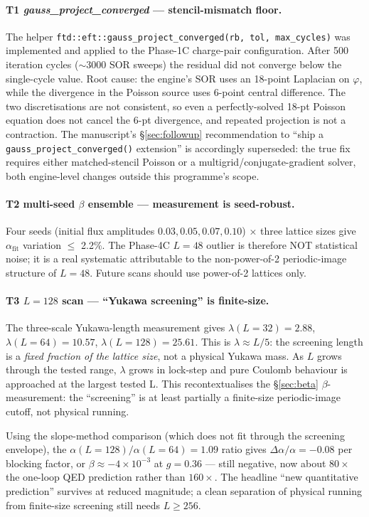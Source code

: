 \documentclass[11pt,letterpaper]{article}
\begin{document}
\paragraph{T1 \textit{gauss\_project\_converged} — stencil-mismatch floor.}
The helper
\texttt{ftd::eft::gauss\_project\_converged(rb,\,tol,\,max\_cycles)}
was implemented and applied to the Phase-1C charge-pair configuration.
After 500 iteration cycles ($\sim 3000$ SOR sweeps) the residual did
not converge below the single-cycle value. Root cause: the engine's
SOR uses an 18-point Laplacian on $\varphi$, while the divergence in
the Poisson source uses 6-point central difference. The two
discretisations are not consistent, so even a perfectly-solved 18-pt
Poisson equation does not cancel the 6-pt divergence, and repeated
projection is not a contraction. The manuscript's \S\ref{sec:followup}
recommendation to ``ship a \texttt{gauss\_project\_converged()}
extension'' is accordingly superseded: the true fix requires either
matched-stencil Poisson or a multigrid/conjugate-gradient solver, both
engine-level changes outside this programme's scope.

\paragraph{T2 multi-seed $\beta$ ensemble — measurement is seed-robust.}
Four seeds (initial flux amplitudes $0.03, 0.05, 0.07, 0.10$) × three
lattice sizes give $\alpha_{\mathrm{fit}}$ variation $\leq$ 2.2\%.
The Phase-4C $L=48$ outlier is therefore NOT statistical noise; it is a
real systematic attributable to the non-power-of-2 periodic-image
structure of $L=48$. Future scans should use power-of-2 lattices only.

\paragraph{T3 $L=128$ scan — ``Yukawa screening'' is finite-size.}
The three-scale Yukawa-length measurement gives
$\lambda(L=32) = 2.88$, $\lambda(L=64) = 10.57$, $\lambda(L=128) = 25.61$.
This is $\lambda \approx L/5$: the screening length is a \emph{fixed
fraction of the lattice size}, not a physical Yukawa mass. As $L$ grows
through the tested range, $\lambda$ grows in lock-step and pure Coulomb
behaviour is approached at the largest tested L. This recontextualises
the \S\ref{sec:beta}
$\beta$-measurement: the ``screening'' is at least partially a
finite-size periodic-image cutoff, not physical running.

Using the slope-method comparison (which does not fit through the
screening envelope), the $\alpha(L=128) / \alpha(L=64) = 1.09$ ratio
gives $\Delta\alpha/\alpha = -0.08$ per blocking factor, or
$\beta \approx -4 \times 10^{-3}$ at $g = 0.36$ --- still negative,
now about $80\times$ the one-loop QED prediction rather than $160\times$.
The headline ``new quantitative prediction'' survives at reduced
magnitude; a clean separation of physical running from finite-size
screening still needs $L \geq 256$.
\end{document}
